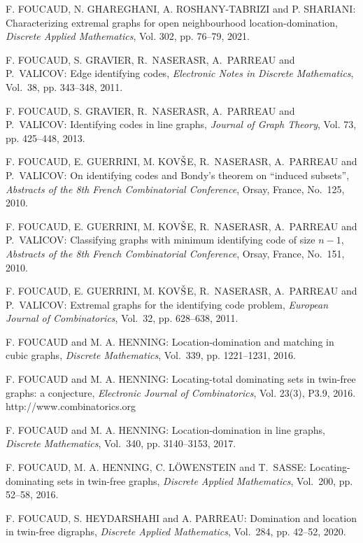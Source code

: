 \begin{thebibliography}{999}
F. FOUCAUD, N. GHAREGHANI, A. ROSHANY-TABRIZI and P. SHARIANI: Characterizing extremal graphs for open neighbourhood location-domination, {\it Discrete Applied Mathematics}, Vol. 302, pp. 76--79, 2021.

F. FOUCAUD, S. GRAVIER, R.~NASERASR, A.~PARREAU and P.~VALICOV: Edge identifying codes, {\it Electronic Notes in Discrete Mathematics}, Vol.~38, pp. 343--348, 2011.

F. FOUCAUD, S. GRAVIER, R.~NASERASR, A.~PARREAU and P.~VALICOV: Identifying codes in line graphs, {\it Journal of Graph Theory}, Vol. 73, pp. 425--448, 2013.

F. FOUCAUD, E. GUERRINI, M. KOV$\check{\rm S}$E, R.~NASERASR, A.~PARREAU and P.~VALICOV: On identifying codes and Bondy's theorem on ``induced subsets'', {\it Abstracts of the 8th French Combinatorial Conference}, Orsay, France, No.~125, 2010.

F. FOUCAUD, E. GUERRINI, M. KOV$\check{\rm S}$E, R.~NASERASR, A.~PARREAU and P.~VALICOV: Classifying graphs with minimum identifying code of size $n-1$, {\it Abstracts of the 8th French Combinatorial Conference}, Orsay, France, No.~151, 2010.

F. FOUCAUD, E. GUERRINI, M. KOV$\check{\rm S}$E, R.~NASERASR, A.~PARREAU and P.~VALICOV: Extremal graphs for the identifying code problem, {\it European Journal of Combinatorics}, Vol.~32, pp. 628--638, 2011.

F. FOUCAUD and M. A. HENNING: Location-domination and matching in cubic graphs, {\it Discrete Mathematics}, Vol.~339, pp. 1221--1231, 2016.

F. FOUCAUD and M. A. HENNING: Locating-total dominating sets in twin-free graphs: a conjecture, {\it Electronic Journal of Combinatorics}, Vol. 23(3), P3.9, 2016.\\
http://www.combinatorics.org

F. FOUCAUD and M. A. HENNING: Location-domination in line graphs, {\it Discrete Mathematics}, Vol.~340, pp. 3140--3153, 2017.

 F. FOUCAUD, M. A. HENNING, C. L\"{O}WENSTEIN and T.~SASSE: Locating-dominating sets in twin-free graphs, {\it Discrete Applied Mathematics}, Vol.~200, pp. 52--58, 2016.

F. FOUCAUD, S. HEYDARSHAHI and A. PARREAU: Domination and location in twin-free digraphs, {\it Discrete Applied Mathematics}, Vol.~284, pp. 42--52, 2020.


\end{thebibliography}
